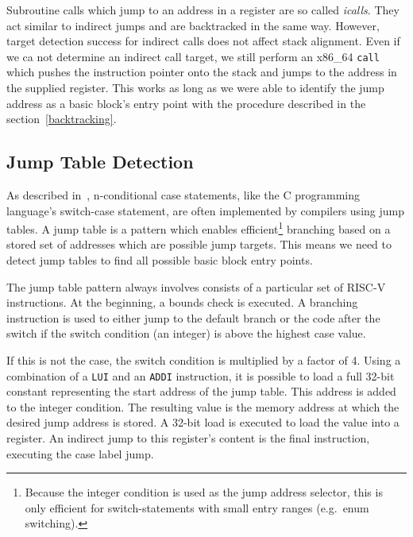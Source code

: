 \documentclass[course=eragp]{aspdoc}
\begin{document}
\par

Subroutine calls which jump to an address in a register are so called \emph{icalls}. They act
similar to indirect jumps and are backtracked in the same way. However, target detection success for indirect calls
does not affect stack alignment. Even if we ca not determine an indirect call target, we still perform
an x86\_64 \texttt{call} which pushes the instruction pointer onto the stack and jumps to the address
in the supplied register. This works as long as we were able to identify the jump address as a basic
block's entry point with the procedure described in the section\ \ref{backtracking}.

\subsection{Jump Table Detection}

As described in\ \cite{jump_table_paper}, n-conditional case statements, like the C programming
language's switch-case statement, are often implemented by compilers using jump
tables. A jump table is a pattern which enables efficient\footnote{Because the integer condition is
    used as the jump address selector, this is only efficient for switch-statements with small entry
    ranges (e.g.\ enum switching).} branching based
on a stored set of addresses which are possible jump targets. This means we need to detect jump tables to find
all possible basic block entry points.

\par

The jump table pattern always involves consists of a particular set of RISC-V instructions.
At the beginning, a bounds check is executed. A branching instruction is used to either jump to the
default branch or the code after the switch if the switch condition (an integer) is above the
highest case value.

\par

If this is not the case, the switch condition is multiplied by a factor of 4.
Using a combination of a \texttt{LUI} and an \texttt{ADDI} instruction, it is possible to load a full
32-bit constant\cite{rvspec} representing the start address of the jump table.
This address is added to the integer condition. The resulting value is the memory address
at which the desired jump address is stored. A 32-bit load is executed to load the value into a
register. An indirect jump to this register's content is the final instruction, executing the case
label jump.
\end{document}
